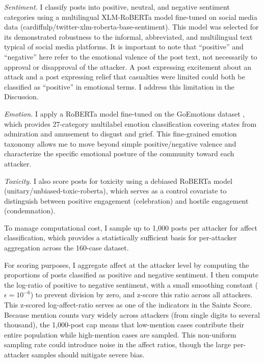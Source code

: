 \documentclass[12pt]{article}
\begin{document}
\textit{Sentiment.} I classify posts into positive, neutral, and negative sentiment categories using a multilingual XLM-RoBERTa model fine-tuned on social media data (cardiffnlp/twitter-xlm-roberta-base-sentiment). This model was selected for its demonstrated robustness to the informal, abbreviated, and multilingual text typical of social media platforms. It is important to note that ``positive'' and ``negative'' here refer to the emotional valence of the post text, not necessarily to approval or disapproval of the attacker. A post expressing excitement about an attack and a post expressing relief that casualties were limited could both be classified as ``positive'' in emotional terms. I address this limitation in the Discussion.

\textit{Emotion.} I apply a RoBERTa model fine-tuned on the GoEmotions dataset \parencite{demszky2020goemotions}, which provides 27-category multilabel emotion classification covering states from admiration and amusement to disgust and grief. This fine-grained emotion taxonomy allows me to move beyond simple positive/negative valence and characterize the specific emotional posture of the community toward each attacker.

\textit{Toxicity.} I also score posts for toxicity using a debiased RoBERTa model (unitary/unbiased-toxic-roberta), which serves as a control covariate to distinguish between positive engagement (celebration) and hostile engagement (condemnation).

To manage computational cost, I sample up to 1,000 posts per attacker for affect classification, which provides a statistically sufficient basis for per-attacker aggregation across the 160-case dataset.

For scoring purposes, I aggregate affect at the attacker level by computing the proportions of posts classified as positive and negative sentiment. I then compute the log-ratio of positive to negative sentiment, with a small smoothing constant ($\epsilon = 10^{-6}$) to prevent division by zero, and z-score this ratio across all attackers. This z-scored log-affect-ratio serves as one of the indicators in the Saints Score. Because mention counts vary widely across attackers (from single digits to several thousand), the 1,000-post cap means that low-mention cases contribute their entire population while high-mention cases are sampled. This non-uniform sampling rate could introduce noise in the affect ratios, though the large per-attacker samples should mitigate severe bias.
\end{document}
